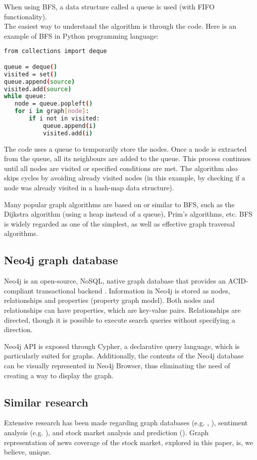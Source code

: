 \newpage
\noindent When using BFS, a data structure called a queue is used (with FIFO functionality).\\
\noindent The easiest way to understand the algorithm is through the code. Here is an example of BFS in Python programming language:
\\

\begin{lstlisting}[caption=Queue data structure in python, captionpos=b, language=bash, label={lst:queue-data-structure}]
from collections import deque

queue = deque()
visited = set()
queue.append(source)
visited.add(source)
while queue:
   node = queue.popleft()
   for i in graph[node]:
       if i not in visited:
           queue.append(i)
           visited.add(i)
\end{lstlisting}

The code uses a queue to temporarily store the nodes. Once a node is extracted from the queue, all its neighbours are added to the queue. This process continues until all nodes are visited or specified conditions are met. The algorithm also skips cycles by avoiding already visited nodes (in this example, by checking if a node was already visited in a hash-map data structure).

Many popular graph algorithms are based on or similar to BFS, such as the Dijkstra algorithm (using a heap instead of a queue), Prim's algorithms, etc. BFS is widely regarded as one of the simplest, as well as effective graph traversal algorithms.

\subsection{Neo4j graph database}
Neo4j is an open-source, NoSQL, native graph database that provides an ACID-compliant transactional backend \cite{Neo4J:online} . Information in Neo4j is stored as nodes, relationships and properties (property graph model). Both nodes and relationships can have properties, which are key-value pairs.
Relationships are directed, though it is possible to execute search queries without specifying a direction.

Neo4j API is exposed through Cypher, a declarative query language, which is particularly suited for graphs.
Additionally, the contents of the Neo4j database can be visually represented in Neo4j Browser, thus eliminating the need of creating a way to display the graph.


\subsection{Similar research}
Extensive research has been made regarding graph databases (e.g. \cite{Arxiv-1-Represent-2211161017:online}, \cite{Arxiv-2-Enter-2108028697:online}), sentiment analysis (e.g. \cite{Anovelen10:online}), and stock market analysis and prediction (\cite{Arxiv-4-Trend-Prediction-1903054480:online}).
Graph representation of news coverage of the stock market, explored in this paper, is, we believe, unique.
